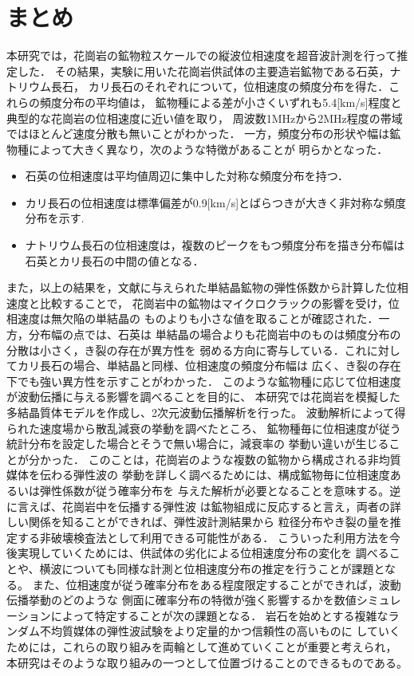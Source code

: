 \documentclass{jsce}
\begin{document}
\section{まとめ}
本研究では，花崗岩の鉱物粒スケールでの縦波位相速度を超音波計測を行って推定した．
その結果，実験に用いた花崗岩供試体の主要造岩鉱物である石英，ナトリウム長石，
カリ長石のそれぞれについて，位相速度の頻度分布を得た．これらの頻度分布の平均値は，
鉱物種による差が小さくいずれも5.4[km/s]程度と典型的な花崗岩の位相速度に近い値を取り，
周波数1MHzから2MHz程度の帯域ではほとんど速度分散も無いことがわかった．
一方，頻度分布の形状や幅は鉱物種によって大きく異なり，次のような特徴があることが
明らかとなった．
\begin{itemize}
\item
石英の位相速度は平均値周辺に集中した対称な頻度分布を持つ．
\item
カリ長石の位相速度は標準偏差が0.9[km/s]とばらつきが大きく非対称な頻度分布を示す. 
\item
ナトリウム長石の位相速度は，複数のピークをもつ頻度分布を描き分布幅は
石英とカリ長石の中間の値となる．
\end{itemize}
また，以上の結果を，文献に与えられた単結晶鉱物の弾性係数から計算した位相速度と比較することで，
花崗岩中の鉱物はマイクロクラックの影響を受け，位相速度は無欠陥の単結晶の
ものよりも小さな値を取ることが確認された．一方，分布幅の点では、石英は
単結晶の場合よりも花崗岩中のものは頻度分布の分散は小さく，き裂の存在が異方性を
弱める方向に寄与している．これに対してカリ長石の場合、単結晶と同様、位相速度の頻度分布幅は
広く、き裂の存在下でも強い異方性を示すことがわかった．
このような鉱物種に応じて位相速度が波動伝播に与える影響を調べることを目的に、
本研究では花崗岩を模擬した多結晶質体モデルを作成し、2次元波動伝播解析を行った。
波動解析によって得られた速度場から散乱減衰の挙動を調べたところ、
鉱物種毎に位相速度が従う統計分布を設定した場合とそうで無い場合に，減衰率の
挙動い違いが生じることが分かった．
このことは，花崗岩のような複数の鉱物から構成される非均質媒体を伝わる弾性波の
挙動を詳しく調べるためには、構成鉱物毎に位相速度あるいは弾性係数が従う確率分布を
与えた解析が必要となることを意味する。逆に言えば、花崗岩中を伝播する弾性波
は鉱物組成に反応すると言え，両者の詳しい関係を知ることができれば、弾性波計測結果から
粒径分布やき裂の量を推定する非破壊検査法として利用できる可能性がある．
こういった利用方法を今後実現していくためには、供試体の劣化による位相速度分布の変化を
調べることや、横波についても同様な計測と位相速度分布の推定を行うことが課題となる。
また、位相速度が従う確率分布をある程度限定することができれば，波動伝播挙動のどのような
側面に確率分布の特徴が強く影響するかを数値シミュレーションによって特定することが次の課題となる．
岩石を始めとする複雑なランダム不均質媒体の弾性波試験をより定量的かつ信頼性の高いものに
していくためには，これらの取り組みを両輪として進めていくことが重要と考えられ，
本研究はそのような取り組みの一つとして位置づけることのできるものである。
\\
\end{document}
